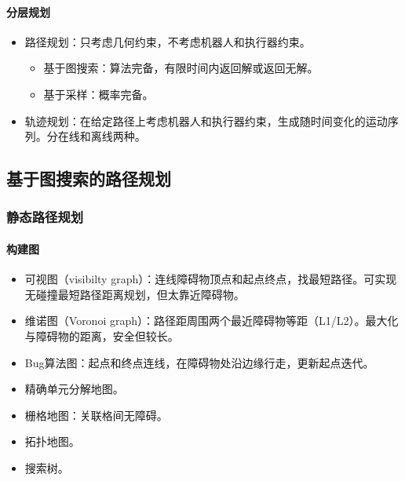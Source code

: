 \documentclass[
12pt, %
a4paper, 
oneside, %
headinclude,footinclude, %
]{scrartcl}
\begin{document}
\paragraph{分层规划}
\begin{itemize}
\item 路径规划：只考虑几何约束，不考虑机器人和执行器约束。
\begin{itemize}
\item 基于图搜索：算法完备，有限时间内返回解或返回无解。
\item 基于采样：概率完备。
\end{itemize}
\item 轨迹规划：在给定路径上考虑机器人和执行器约束，生成随时间变化的运动序列。分在线和离线两种。
\end{itemize}
\subsection[基于图搜索的路径规划]{基于图搜索的路径规划}
\subsubsection[静态路径规划]{静态路径规划}
\paragraph{构建图}
\begin{itemize}
\item 可视图（visibilty graph）：连线障碍物顶点和起点终点，找最短路径。可实现无碰撞最短路径距离规划，但太靠近障碍物。
\item 维诺图（Voronoi graph）：路径距周围两个最近障碍物等距（L1/L2）。最大化与障碍物的距离，安全但较长。
\item Bug算法图：起点和终点连线，在障碍物处沿边缘行走，更新起点迭代。
\item 精确单元分解地图。
\item 栅格地图：关联格间无障碍。
\item 拓扑地图。
\item 搜索树。
\end{itemize}
\end{document}
